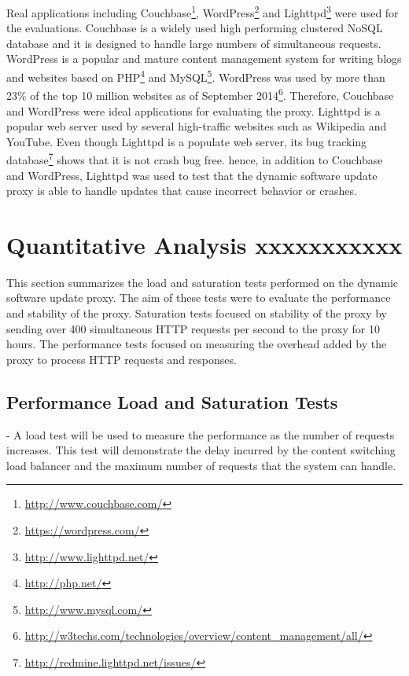 \documentclass[a4paper,11pt,twoside]{report}
\begin{document}
Real applications including Couchbase\footnote{\label{couchbase} \url{http://www.couchbase.com/}}, WordPress\footnote{\label{wordpress} \url{https://wordpress.com/}} and Lighttpd\footnote{\label{lighttpd}\url{http://www.lighttpd.net/}} were used for the evaluations. Couchbase is a widely used high performing clustered NoSQL database and it is designed to handle large numbers of  simultaneous requests. WordPress is a popular and mature content management system for writing blogs and websites based on PHP\footnote{\label{PHP}\url{http://php.net/}} and MySQL\footnote{\label{MySQL}\url{http://www.mysql.com/}}. WordPress was used by more than 23\% of the top 10 million websites as of September 2014\footnote{\label{w3techs}\url{http://w3techs.com/technologies/overview/content_management/all/}}. Therefore, Couchbase and WordPress were ideal applications for evaluating the proxy. Lighttpd is a popular web server used by several high-traffic websites such as Wikipedia and YouTube. Even though Lighttpd is a populate web server, its bug tracking database\footnote{\label{redmine}\url{http://redmine.lighttpd.net/issues/}} shows that it is not crash bug free. hence, in addition to Couchbase and WordPress,  Lighttpd was used to test that the dynamic software update proxy is able to handle updates that cause incorrect behavior or crashes.     

\section{Quantitative Analysis xxxxxxxxxxx}\label{Quantitative_Analysis}
This section summarizes the load and saturation tests performed on the dynamic software update proxy. The aim of these tests were to evaluate the performance and stability of the proxy. Saturation tests focused on stability of the proxy by sending over 400 simultaneous HTTP requests per second to the proxy for 10 hours. The performance tests focused on measuring the overhead added by the proxy to process HTTP requests and responses.

\subsection{Performance Load and Saturation Tests}\label{load} - A load test will be used to measure the performance as the number of requests increases. This test will demonstrate the delay incurred by the content switching load balancer and the maximum number of requests that the system can handle.
\end{document}

